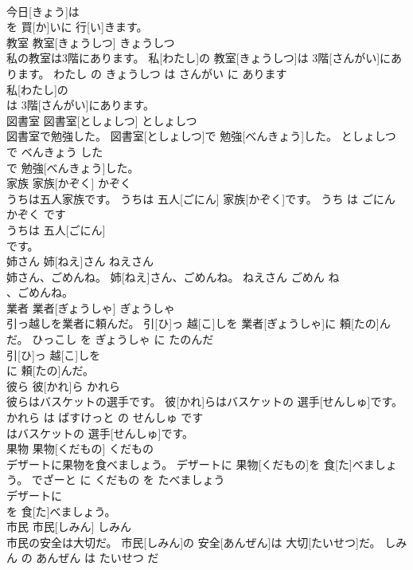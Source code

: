 \documentclass[8pt]{extreport}
\begin{document}
\begin{CJK}{UTF8}{min}
\\	今日[きょう]は
\\	を 買[か]いに 行[い]きます。			
\\	教室	教室[きょうしつ]	きょうしつ	
\\	私の教室は3階にあります。	私[わたし]の 教室[きょうしつ]は 3階[さんがい]にあります。	わたし の きょうしつ は さんがい に あります	
\\	私[わたし]の
\\	は 3階[さんがい]にあります。			
\\	図書室	図書室[としょしつ]	としょしつ	
\\	図書室で勉強した。	図書室[としょしつ]で 勉強[べんきょう]した。	としょしつ で べんきょう した	
\\	で 勉強[べんきょう]した。			
\\	家族	家族[かぞく]	かぞく	
\\	うちは五人家族です。	うちは 五人[ごにん] 家族[かぞく]です。	うち は ごにん かぞく です	
\\	うちは 五人[ごにん]
\\	です。			
\\	姉さん	姉[ねえ]さん	ねえさん	
\\	姉さん、ごめんね。	姉[ねえ]さん、ごめんね。	ねえさん ごめん ね	
\\	、ごめんね。			
\\	業者	業者[ぎょうしゃ]	ぎょうしゃ	
\\	引っ越しを業者に頼んだ。	引[ひ]っ 越[こ]しを 業者[ぎょうしゃ]に 頼[たの]んだ。	ひっこし を ぎょうしゃ に たのんだ	
\\	引[ひ]っ 越[こ]しを
\\	に 頼[たの]んだ。			
\\	彼ら	彼[かれ]ら	かれら	
\\	彼らはバスケットの選手です。	彼[かれ]らはバスケットの 選手[せんしゅ]です。	かれら は ばすけっと の せんしゅ です	
\\	はバスケットの 選手[せんしゅ]です。			
\\	果物	果物[くだもの]	くだもの	
\\	デザートに果物を食べましょう。	デザートに 果物[くだもの]を 食[た]べましょう。	でざーと に くだもの を たべましょう	
\\	デザートに
\\	を 食[た]べましょう。			
\\	市民	市民[しみん]	しみん	
\\	市民の安全は大切だ。	市民[しみん]の 安全[あんぜん]は 大切[たいせつ]だ。	しみん の あんぜん は たいせつ だ	

\end{CJK}
\end{document}
